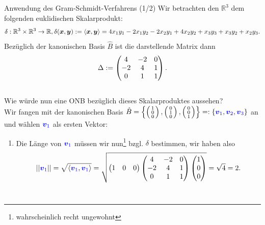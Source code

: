 \begin{Beispiel}
{Anwendung des Gram-Schmidt-Verfahrens (1/2)}
Wir betrachten den $\mathbb{R}^3$ dem folgenden euklidischen Skalarprodukt:
\begin{equation*}
    \delta:\mathbb{R}^3\times \mathbb{R}^3\to\mathbb{R},\\
    \delta({{\text{\boldmath${x}$}}},{{\text{\boldmath${y}$}}}):=\left\langle{{\text{\boldmath${x}$}}},{{\text{\boldmath${y}$}}}\right\rangle=4x_1y_1-2x_1y_2-2x_2y_1+4x_2y_2+x_3y_3+ x_3y_2+x_2y_3.
\end{equation*}
Bezüglich der kanonischen Basis $\hat{B}$ ist die darstellende Matrix dann
\begin{equation*}
    \Delta:=\begin{pmatrix}4&-2&0\\-2&4&1\\0&1&1\end{pmatrix}.
\end{equation*}
\\
Wie würde nun eine ONB bezüglich dieses Skalarproduktes aussehen?\\
Wir fangen mit der kanonischen Basis $\hat{B}=\left\{\left(\begin{smallmatrix}1\\0\\0\end{smallmatrix}\right),\left(\begin{smallmatrix}0\\1\\0\end{smallmatrix}\right),\left(\begin{smallmatrix}0\\0\\1\end{smallmatrix}\right)\right\}=:\left\{\textcolor{blue}{{{\text{\boldmath${v}$}}}_1},\textcolor{blue}{{{\text{\boldmath${v}$}}}_2},\textcolor{blue}{{{\text{\boldmath${v}$}}}_3}\right\}$ an und wählen $\textcolor{blue}{{{\text{\boldmath${v}$}}}_1}$ als ersten Vektor:
\begin{enumerate}
    \item Die Länge von $\textcolor{blue}{{{\text{\boldmath${v}$}}}_1}$ müssen wir nun\footnote{wahrscheinlich recht ungewohnt} bzgl. $\delta$ bestimmen, wir haben also
    \begin{equation*}
        \left|\left|\textcolor{blue}{{{\text{\boldmath${v}$}}}_1}\right|\right|=\sqrt{\left\langle\textcolor{blue}{{{\text{\boldmath${v}$}}}_1},\textcolor{blue}{{{\text{\boldmath${v}$}}}_1}\right\rangle}=\sqrt{\begin{pmatrix}1&0&0\end{pmatrix}\begin{pmatrix}4&-2&0\\-2&4&1\\0&1&1\end{pmatrix}\begin{pmatrix}1\\0\\0\end{pmatrix}}=\sqrt{4}=2.
    \end{equation*}
    \\

\end{enumerate}
\end{Beispiel}
